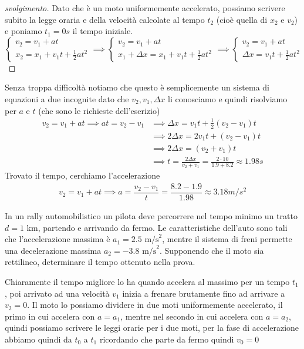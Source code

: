 \documentclass{rapport}
\begin{document}
\begin{proof}[svolgimento]
  Dato che è un moto uniformemente accelerato, possiamo scrivere subito la legge oraria e della velocità calcolate al tempo $t_2$ (cioè quella di $x_2$ e $v_2$) e poniamo $t_1=0s$ il tempo iniziale.
  \[
\begin{cases}
  v_2 = v_1 + at \\
  x_2 = x_1 + v_1t + \frac{1}{2}at^2
\end{cases} \implies\begin{cases}
  v_2 = v_1 + at \\
  x_1 + \Delta x = x_1 + v_1t + \frac{1}{2}at^2
\end{cases} \implies\begin{cases}
  v_2 = v_1 + at \\
  \Delta x = v_1t + \frac{1}{2}at^2
\end{cases} 
  \]
\end{proof}
Senza troppa difficoltà notiamo che questo è semplicemente un sistema di equazioni a due incognite dato che $v_2,v_1,\Delta x$ li conosciamo e quindi risolviamo per $a$  e $t$ (che sono le richieste dell'eserizio)
\begin{align*}
v_2 = v_1 + at \implies at = v_2-v_1 &\implies \Delta x = v_1t + \frac{1}{2}(v_2-v_1)t\\[0.3em]
  &\implies 2\Delta x = 2v_1t + (v_2-v_1)t \\[0.3em]
   &\implies 2\Delta x =(v_2+v_1)t  \\[0.3em]
    &\implies t = \frac{2\Delta x}{v_2+v_1} = \frac{2\cdot 10}{1.9 + 8.2} \approx 1.98s
\end{align*}
Trovato il tempo, cerchiamo l'accelerazione
\begin{align*}
  v_2 = v_1 + at \implies a = \dfrac{v_2-v_1}{t} = \dfrac{8.2-1.9}{1.98} \approx 3.18m/s^2
\end{align*}

\begin{esercizio}{}{}
  In un rally automobilistico un pilota deve percorrere nel tempo minimo un tratto $d = 1 \text{ km}$, partendo e arrivando da fermo. Le caratteristiche dell'auto sono tali che l'accelerazione massima è $a_1 = 2.5 \text{ m/s}^2$, mentre il sistema di freni permette una decelerazione massima $a_2 = -3.8 \text{ m/s}^2$. Supponendo che il moto sia rettilineo, determinare il tempo ottenuto nella prova.
\end{esercizio}
Chiaramente il tempo migliore lo ha quando accelera al massimo per un tempo $t_1$, poi arrivato ad una velocità $v_1$ inizia a frenare brutamente fino ad arrivare a $v_2 =0$. Il moto lo possiamo dividere in due moti uniformemente accelerato, il primo in cui accelera con $a=a_1$, mentre nel secondo in cui accelera con $a=a_2$, quindi possiamo scrivere le leggi orarie per i due moti, per la fase di accelerazione abbiamo quindi da $t_0$ a $t_1$ ricordando che parte da fermo quindi $v_0=0$
\end{document}
